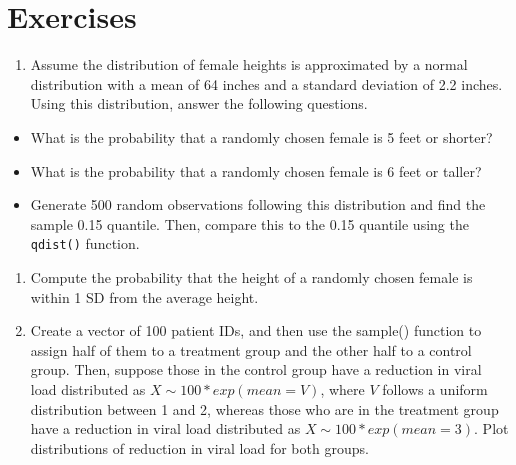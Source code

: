 \documentclass[
  letterpaper,
]{krantz}
\makeatletter
\newenvironment{Shaded}{\begin{snugshade}}{\end{snugshade}}
\newcommand{\CommentTok}[1]{\textcolor[rgb]{0.37,0.37,0.37}{#1}}
\newcommand{\DecValTok}[1]{\textcolor[rgb]{0.68,0.00,0.00}{#1}}
\newcommand{\FunctionTok}[1]{\textcolor[rgb]{0.28,0.35,0.67}{#1}}
\newcommand{\NormalTok}[1]{\textcolor[rgb]{0.00,0.23,0.31}{#1}}
\newcommand{\OtherTok}[1]{\textcolor[rgb]{0.00,0.23,0.31}{#1}}
\newcommand{\SpecialCharTok}[1]{\textcolor[rgb]{0.37,0.37,0.37}{#1}}
\providecommand{\tightlist}{%
  \setlength{\itemsep}{0pt}\setlength{\parskip}{0pt}}\usepackage{longtable,booktabs,array}
\newenvironment{kframe}{%
\medskip{}
\setlength{\fboxsep}{.8em}
 \def\at@end@of@kframe{}%
 \ifinner\ifhmode%
  \def\at@end@of@kframe{\end{minipage}}%
  \begin{minipage}{\columnwidth}%
 \fi\fi%
 \def\FrameCommand##1{\hskip\@totalleftmargin \hskip-\fboxsep
 \colorbox{shadecolor}{##1}\hskip-\fboxsep
     \hskip-\linewidth \hskip-\@totalleftmargin \hskip\columnwidth}%
 \MakeFramed {\advance\hsize-\width
   \@totalleftmargin\z@ \linewidth\hsize
   \@setminipage}}%
 {\par\unskip\endMakeFramed%
 \at@end@of@kframe}
\renewenvironment{Shaded}{\begin{kframe}}{\end{kframe}}
\makeatother
\begin{document}
\begin{Shaded}
\end{Shaded}

\hypertarget{exercises-6}{%
\section{Exercises}\label{exercises-6}}

\begin{enumerate}
\def\labelenumi{\arabic{enumi}.}
\tightlist
\item
  Assume the distribution of female heights is approximated by a normal
  distribution with a mean of 64 inches and a standard deviation of 2.2
  inches. Using this distribution, answer the following questions.
\end{enumerate}

\begin{itemize}
\item
  What is the probability that a randomly chosen female is 5 feet or
  shorter?
\item
  What is the probability that a randomly chosen female is 6 feet or
  taller?
\item
  Generate 500 random observations following this distribution and find
  the sample 0.15 quantile. Then, compare this to the 0.15 quantile
  using the \texttt{qdist()} function.
\end{itemize}

\begin{enumerate}
\def\labelenumi{\arabic{enumi}.}
\setcounter{enumi}{1}
\item
  Compute the probability that the height of a randomly chosen female is
  within 1 SD from the average height.
\item
  Create a vector of 100 patient IDs, and then use the sample() function
  to assign half of them to a treatment group and the other half to a
  control group. Then, suppose those in the control group have a
  reduction in viral load distributed as \(X \sim 100*exp(mean = V)\),
  where \(V\) follows a uniform distribution between 1 and 2, whereas
  those who are in the treatment group have a reduction in viral load
  distributed as \(X \sim 100*exp(mean = 3)\). Plot distributions of
  reduction in viral load for both groups.
\end{enumerate}
\end{document}
